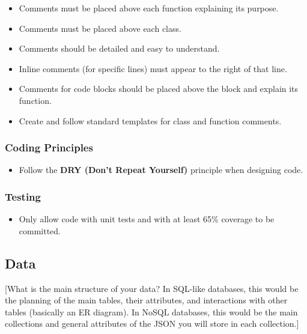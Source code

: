 \documentclass{article}
\begin{document}
\begin{itemize}
    \item Comments must be placed above each function explaining its purpose.
    \item Comments must be placed above each class.
    \item Comments should be detailed and easy to understand.
    \item Inline comments (for specific lines) must appear to the right of that line.
    \item Comments for code blocks should be placed above the block and explain its function.
    \item Create and follow standard templates for class and function comments.
\end{itemize}

\subsubsection{Coding Principles}

\begin{itemize}
    \item Follow the \textbf{DRY (Don't Repeat Yourself)} principle when designing code.
\end{itemize}
\subsubsection{Testing}
    \begin{itemize}
    \item Only allow code with unit tests and with at least 65\% coverage to be committed.
\end{itemize}

\subsection{Data}
[What is the main structure of your data? In SQL-like databases, this would be the planning of the main tables, their attributes, and interactions with other tables (basically an ER diagram). In NoSQL databases, this would be the main collections and general attributes of the JSON you will store in each collection.]
\end{document}

